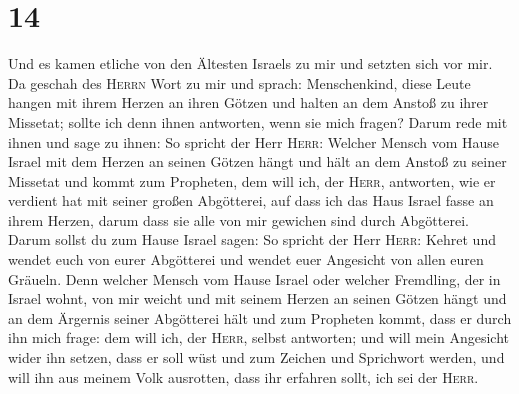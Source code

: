 \hypertarget{section-13}{%
\section{14}\label{section-13}}

 Und es kamen etliche von den Ältesten Israels zu mir und
setzten sich vor mir.  Da geschah des \textsc{Herrn} Wort
zu mir und sprach:  Menschenkind, diese Leute hangen mit
ihrem Herzen an ihren Götzen und halten an dem Anstoß zu ihrer Missetat;
sollte ich denn ihnen antworten, wenn sie mich fragen? 
Darum rede mit ihnen und sage zu ihnen: So spricht der Herr
\textsc{Herr}: Welcher Mensch vom Hause Israel mit dem Herzen an seinen
Götzen hängt und hält an dem Anstoß zu seiner Missetat und kommt zum
Propheten, dem will ich, der \textsc{Herr}, antworten, wie er verdient
hat mit seiner großen Abgötterei,  auf dass ich das Haus
Israel fasse an ihrem Herzen, darum dass sie alle von mir gewichen sind
durch Abgötterei.  Darum sollst du zum Hause Israel sagen:
So spricht der Herr \textsc{Herr}: Kehret und wendet euch von eurer
Abgötterei und wendet euer Angesicht von allen euren Gräueln.
 Denn welcher Mensch vom Hause Israel oder welcher
Fremdling, der in Israel wohnt, von mir weicht und mit seinem Herzen an
seinen Götzen hängt und an dem Ärgernis seiner Abgötterei hält und zum
Propheten kommt, dass er durch ihn mich frage: dem will ich, der
\textsc{Herr}, selbst antworten;  und will mein Angesicht
wider ihn setzen, dass er soll wüst und zum Zeichen und Sprichwort
werden, und will ihn aus meinem Volk ausrotten, dass ihr erfahren sollt,
ich sei der \textsc{Herr}.


